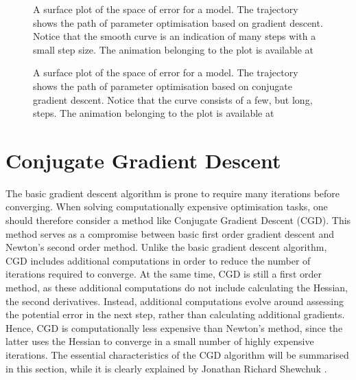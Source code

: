 \begin{figure}
    \centering
    
    \caption{A surface plot of the space of error for a model. The trajectory shows the path of parameter optimisation based on gradient descent.
        Notice that the smooth curve is an indication of many steps with a small step size. The animation belonging to the plot is available at %
    }
    \label{fig:GD_surface}
\end{figure}

\begin{figure}
    \centering
    
    \caption{A surface plot of the space of error for a model. The trajectory shows the path of parameter optimisation based on conjugate gradient descent.
        Notice that the curve consists of a few, but long, steps. The animation belonging to the plot is available at %
    }
    \label{fig:CGD_surface}
\end{figure}



\section{Conjugate Gradient Descent}
\noindent
The basic gradient descent algorithm is prone to require many iterations before converging.
When solving computationally expensive optimisation tasks,
one should therefore consider a method like Conjugate Gradient Descent (CGD).
This method serves as a compromise between basic first order gradient descent and Newton's second order method.
Unlike the basic gradient descent algorithm, CGD includes additional computations in order to reduce the number of iterations required to converge.
At the same time, CGD is still a first order method, as these additional computations do not include calculating the Hessian, the second derivatives.
Instead, additional computations evolve around assessing the potential error in the next step, rather than calculating additional gradients.
Hence, CGD is computationally less expensive than Newton's method, since
the latter uses the Hessian to converge in a small number of highly expensive iterations.
The essential characteristics of the CGD algorithm will be summarised in this section, while it is clearly explained by Jonathan Richard Shewchuk \cite{shewchuk1994introduction}.


